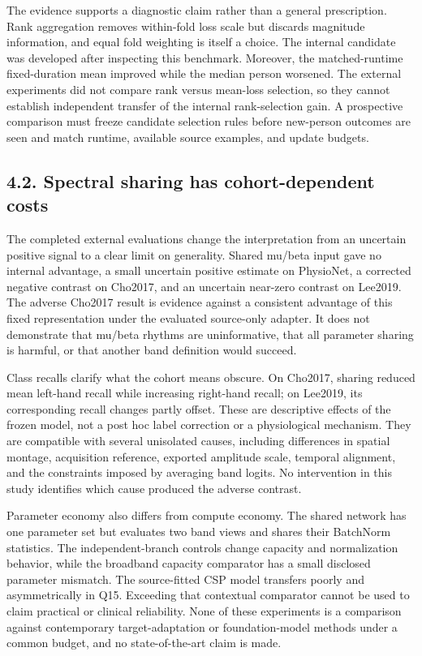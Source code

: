 \documentclass[11pt]{article}
\begin{document}
The evidence supports a diagnostic claim rather than a general prescription. Rank aggregation removes within-fold loss scale but discards magnitude information, and equal fold weighting is itself a choice. The internal candidate was developed after inspecting this benchmark. Moreover, the matched-runtime fixed-duration mean improved while the median person worsened. The external experiments did not compare rank versus mean-loss selection, so they cannot establish independent transfer of the internal rank-selection gain. A prospective comparison must freeze candidate selection rules before new-person outcomes are seen and match runtime, available source examples, and update budgets.

\subsection*{4.2. Spectral sharing has cohort-dependent costs}
The completed external evaluations change the interpretation from an uncertain positive signal to a clear limit on generality. Shared mu/beta input gave no internal advantage, a small uncertain positive estimate on PhysioNet, a corrected negative contrast on Cho2017, and an uncertain near-zero contrast on Lee2019. The adverse Cho2017 result is evidence against a consistent advantage of this fixed representation under the evaluated source-only adapter. It does not demonstrate that mu/beta rhythms are uninformative, that all parameter sharing is harmful, or that another band definition would succeed.

Class recalls clarify what the cohort means obscure. On Cho2017, sharing reduced mean left-hand recall while increasing right-hand recall; on Lee2019, its corresponding recall changes partly offset. These are descriptive effects of the frozen model, not a post hoc label correction or a physiological mechanism. They are compatible with several unisolated causes, including differences in spatial montage, acquisition reference, exported amplitude scale, temporal alignment, and the constraints imposed by averaging band logits. No intervention in this study identifies which cause produced the adverse contrast.

Parameter economy also differs from compute economy. The shared network has one parameter set but evaluates two band views and shares their BatchNorm statistics. The independent-branch controls change capacity and normalization behavior, while the broadband capacity comparator has a small disclosed parameter mismatch. The source-fitted CSP model transfers poorly and asymmetrically in Q15. Exceeding that contextual comparator cannot be used to claim practical or clinical reliability. None of these experiments is a comparison against contemporary target-adaptation or foundation-model methods under a common budget, and no state-of-the-art claim is made.
\end{document}
